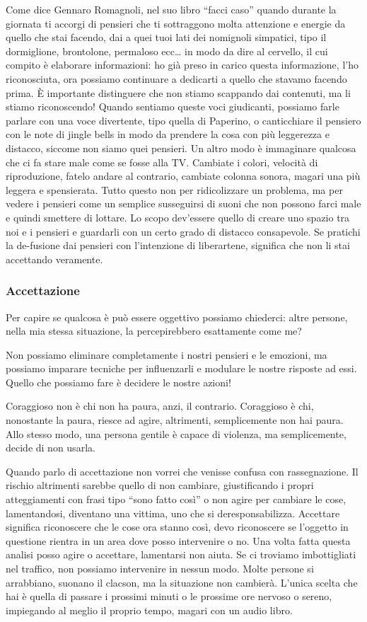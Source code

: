 \documentclass[12pt]{book} %
\begin{document}
Come dice Gennaro Romagnoli, nel suo libro “facci caso” quando durante la giornata ti accorgi di pensieri che ti sottraggono
molta attenzione e energie da quello che stai facendo, dai a quei tuoi lati dei nomignoli simpatici, tipo il
dormiglione, brontolone, permaloso ecc… in modo da dire al
cervello, il cui compito è elaborare informazioni: ho già preso in carico questa informazione, l'ho riconosciuta, ora
possiamo continuare a dedicarti a quello che stavamo facendo prima. È importante distinguere che non stiamo scappando
dai contenuti, ma li stiamo riconoscendo! Quando sentiamo queste voci giudicanti, possiamo farle parlare con una voce
divertente, tipo quella di Paperino, o canticchiare il pensiero con le note di jingle bells in modo da prendere la cosa
con più leggerezza e distacco, siccome non siamo quei pensieri. Un altro modo è immaginare qualcosa che ci fa stare
male come se fosse alla TV. Cambiate i colori, velocità di riproduzione, fatelo andare al contrario, cambiate colonna
sonora, magari una più leggera e spensierata. Tutto questo non per ridicolizzare un problema, ma per vedere i pensieri
come un semplice susseguirsi di suoni che non possono farci male e quindi smettere di lottare. Lo scopo
dev'essere quello di creare uno spazio tra noi e i pensieri e guardarli con un certo grado di
distacco consapevole. Se pratichi la de-fusione dai pensieri con l'intenzione di liberartene,
significa che non li stai accettando veramente.

\subsubsection{Accettazione}
Per capire se qualcosa è può essere oggettivo possiamo chiederci: altre persone, nella mia stessa situazione, la
percepirebbero esattamente come me?

Non possiamo eliminare completamente i nostri pensieri e le emozioni, ma possiamo imparare tecniche per influenzarli e modulare le nostre risposte ad essi. Quello che possiamo fare è decidere le nostre azioni!

Coraggioso non è chi non ha paura, anzi, il contrario. Coraggioso è chi, nonostante la paura, riesce ad agire, altrimenti, semplicemente non hai paura.
Allo stesso modo, una persona gentile è capace di violenza, ma semplicemente, decide di non usarla.

Quando parlo di accettazione non vorrei che venisse confusa con rassegnazione. Il rischio altrimenti sarebbe quello di
non cambiare, giustificando i propri atteggiamenti con frasi tipo “sono fatto così” o non agire per cambiare le
cose, lamentandosi, diventano una vittima, uno che si deresponsabilizza. Accettare significa riconoscere
che le cose ora stanno così, devo riconoscere se l'oggetto in questione rientra in un area dove
posso intervenire o no. Una volta fatta questa analisi posso agire o accettare, lamentarsi non aiuta. Se ci
troviamo imbottigliati nel traffico, non possiamo intervenire in nessun modo. Molte persone si arrabbiano, suonano il
clacson, ma la situazione non cambierà. L'unica scelta che hai è quella di passare i prossimi
minuti o le prossime ore nervoso o sereno, impiegando al meglio il proprio tempo, magari con un audio libro. 
\end{document}

